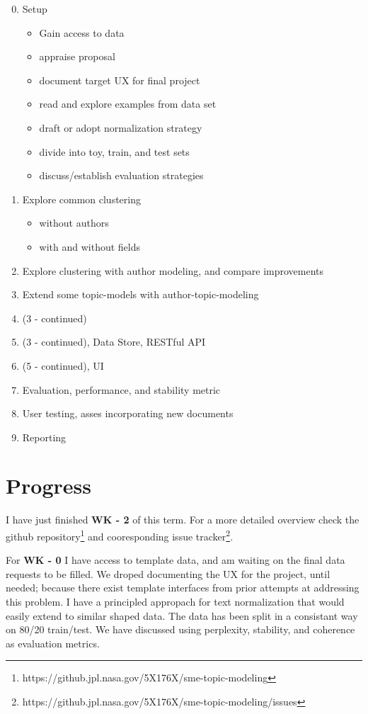 \documentclass{article}
\begin{document}
\begin{multicols}{2}
\begin{enumerate}[\texttt{WK} 1 -]
  \setcounter{enumi}{-1}
\item Setup
  \begin{itemize}
  \item Gain access to data
  \item appraise proposal
  \item document target UX for final project
  \item read and explore examples from data set
  \item draft or adopt normalization strategy
  \item divide into toy, train, and test sets
  \item discuss/establish evaluation strategies
  \end{itemize}
\item Explore common clustering
  \begin{itemize}
  \item without authors
  \item with and without fields
  \end{itemize}
\item Explore clustering with author modeling, and compare improvements
\item Extend some topic-models with author-topic-modeling
\item (3 - continued)
\item (3 - continued), Data Store, RESTful API
\item (5 - continued), UI
\item Evaluation, performance, and stability metric
\item User testing, asses incorporating new documents
\item Reporting
\end{enumerate}

\vfill
\columnbreak

\section{Progress}

I have just finished {\bf WK - 2} of this term. For a more detailed overview check the github repository\footnote{https://github.jpl.nasa.gov/5X176X/sme-topic-modeling} and cooresponding issue tracker\footnote{https://github.jpl.nasa.gov/5X176X/sme-topic-modeling/issues}.

For {\bf WK - 0} I have access to template data, and am waiting on the final data requests to be filled. We droped documenting the UX for the project, until needed; because there exist template interfaces from prior attempts at addressing this problem. I have a principled appropach for text normalization that would easily extend to similar shaped data. The data has been split in a consistant way on 80/20 train/test. We have discussed using perplexity, stability, and coherence as evaluation metrics.


\end{multicols}
\end{document}
